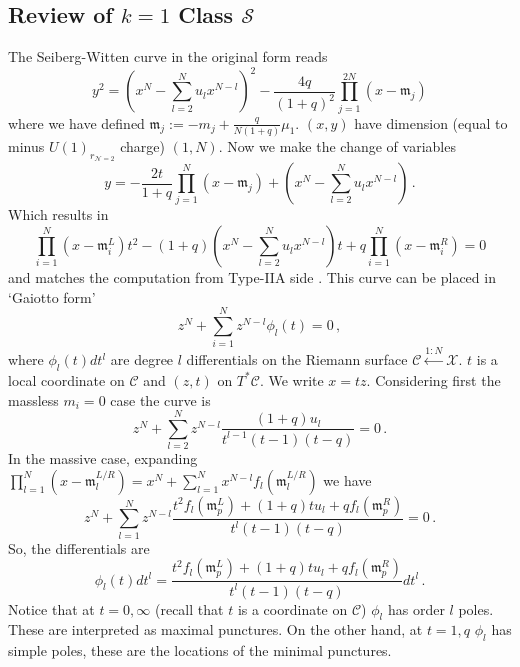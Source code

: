 \documentclass[main.tex]{subfiles}
\begin{document}
\subsection{Review of \texorpdfstring{$k=1$}{k=1} Class \texorpdfstring{$\mathcal{S}$}{S}}
The Seiberg-Witten curve in the original form reads  \cite{Argyres:1995wt}
\begin{equation}
y^2=\left(x^N-\sum_{l=2}^Nu_{l}x^{N-l}\right)^2-\frac{4q}{(1+q)^2}\prod_{j=1}^{2N}\left(x-\mathfrak{m}_j\right)
\end{equation}
where we have defined $\mathfrak{m}_j:=-m_j+\frac{q}{N(1+q)}\mu_1$. $(x,y)$ have dimension (equal to minus $U(1)_{r_{\mathcal{N}=2}}$ charge) $(1,N)$. Now we make the change of variables
\begin{equation}
y=-\frac{2t}{1+q}\prod_{j=1}^N\left(x-\mathfrak{m}_j\right)+\left(x^N-\sum_{l=2}^Nu_{l}x^{N-l}\right)\,.
\end{equation}
Which results in
\begin{equation}
\prod_{i=1}^N(x-\mathfrak{m}^L_i)t^2-(1+q)\left(x^N-\sum_{l=2}^Nu_lx^{N-l}\right)t+q\prod_{i=1}^{N}(x-\mathfrak{m}^R_i)=0
\end{equation}
and matches the computation from Type-IIA side \cite{Witten:1997sc}.
This curve can be placed in `Gaiotto form' 
\begin{equation}
z^N+\sum_{i=1}^Nz^{N-l}\phi_l(t)=0\,,
\end{equation}
where $\phi_l(t)dt^l$ are degree $l$ differentials on the Riemann surface $\mathcal{C}\xleftarrow{1:N}\mathcal{X}$. $t$ is a local coordinate on $\mathcal{C}$ and $(z,t)$ on $T^*\mathcal{C}$. We write $x=tz$. Considering first the massless $m_i=0$ case the curve is
\begin{equation}
z^N+\sum_{l=2}^Nz^{N-l}\frac{(1+q)u_l}{t^{l-1}(t-1)(t-q)}=0\,.
\end{equation}
In the massive case, expanding $\prod_{l=1}^N(x-\mathfrak{m}^{L/R}_l)=x^N+\sum_{l=1}^Nx^{N-l}f_l(\mathfrak{m}^{L/R}_l)$ we have
\begin{equation}
z^N+\sum_{l=1}^Nz^{N-l}\frac{t^{2}f_l(\mathfrak{m}^{L}_p)+(1+q)tu_l+qf_l(\mathfrak{m}_p^R)}{t^l(t-1)(t-q)}=0\,.
\end{equation}
So, the differentials are
\begin{equation}
\phi_l(t)dt^l=\frac{t^{2}f_l(\mathfrak{m}^{L}_p)+(1+q)tu_l+qf_l(\mathfrak{m}_p^R)}{t^l(t-1)(t-q)}dt^l\,.
\end{equation}
Notice that at $t=0,\infty$ (recall that $t$ is a coordinate on $\mathcal{C}$) $\phi_l$ has order $l$ poles. These are interpreted as maximal punctures. On the other hand, at $t=1,q$ $\phi_l$ has simple poles, these are the locations of the minimal punctures.
\end{document}
